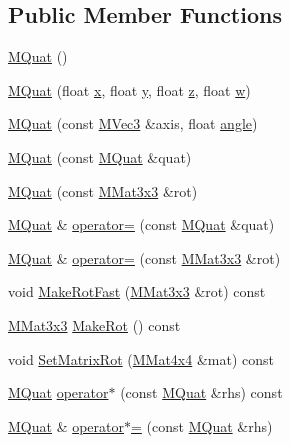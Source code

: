 \subsection*{Public Member Functions}
\begin{CompactItemize}
\item 
\hyperlink{class_m_quat_9fd65558912003344340a92e641a3988}{MQuat} ()
\item 
\hyperlink{class_m_quat_d5119507f40c8e5891690120e1f29c81}{MQuat} (float \hyperlink{wglext_8h_d77deca22f617d3f0e0eb786445689fc}{x}, float \hyperlink{wglext_8h_9298c7ad619074f5285b32c6b72bfdea}{y}, float \hyperlink{glext__bak_8h_5b27107fca91cf19a778530405575b37}{z}, float \hyperlink{glext__bak_8h_d47d000a8e40b26a33682e10ae32a1b6}{w})
\item 
\hyperlink{class_m_quat_4072fed107ac31bde4da73c7a15f5e2b}{MQuat} (const \hyperlink{class_m_vec3}{MVec3} \&axis, float \hyperlink{glext_8h_9e06c1f76a20fed54ca742cd25cb02c4}{angle})
\item 
\hyperlink{class_m_quat_b6c59f60d6af948d46f8792105cff2f2}{MQuat} (const \hyperlink{class_m_quat}{MQuat} \&quat)
\item 
\hyperlink{class_m_quat_5165e0d3a6ac93bc29862d30131212ad}{MQuat} (const \hyperlink{class_m_mat3x3}{MMat3x3} \&rot)
\item 
\hyperlink{class_m_quat}{MQuat} \& \hyperlink{class_m_quat_63cecf05b4c066e66091e952e0b2a6cc}{operator=} (const \hyperlink{class_m_quat}{MQuat} \&quat)
\item 
\hyperlink{class_m_quat}{MQuat} \& \hyperlink{class_m_quat_6b16ae3c681ab3e7712bd1c3e9d8bb83}{operator=} (const \hyperlink{class_m_mat3x3}{MMat3x3} \&rot)
\item 
void \hyperlink{class_m_quat_aa5548b76fe9f7c711792010bf5e6420}{MakeRotFast} (\hyperlink{class_m_mat3x3}{MMat3x3} \&rot) const 
\item 
\hyperlink{class_m_mat3x3}{MMat3x3} \hyperlink{class_m_quat_c72f53b8d276a8cfe6b6426e9c01909c}{MakeRot} () const 
\item 
void \hyperlink{class_m_quat_09045cf01b60cbd8894da32f1fa04eed}{SetMatrixRot} (\hyperlink{class_m_mat4x4}{MMat4x4} \&mat) const 
\item 
\hyperlink{class_m_quat}{MQuat} \hyperlink{class_m_quat_a3d68d57f2163eb7f626b2fffbe0bcb3}{operator$\ast$} (const \hyperlink{class_m_quat}{MQuat} \&rhs) const 
\item 
\hyperlink{class_m_quat}{MQuat} \& \hyperlink{class_m_quat_42f61bacf7e7ed17c21a8008e6f32859}{operator$\ast$=} (const \hyperlink{class_m_quat}{MQuat} \&rhs)

\end{CompactItemize}

